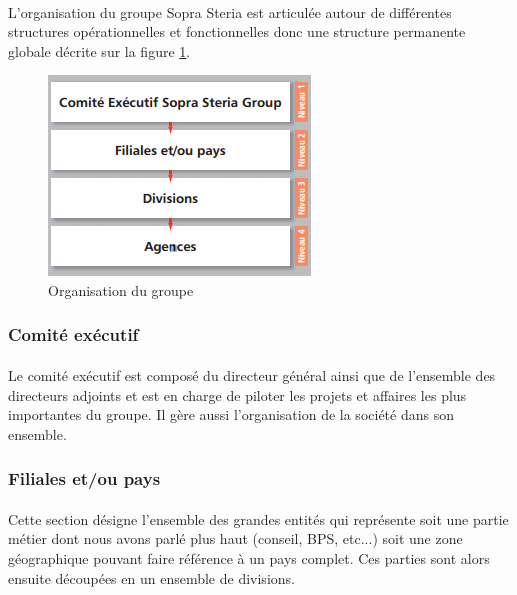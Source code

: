 \paragraph{}
L'organisation du groupe Sopra Steria est articulée autour de différentes structures opérationnelles et fonctionnelles donc une structure permanente globale décrite sur la figure \ref{sopraSteriaOrganisation}.

\begin{figure}[h]
	\includegraphics[scale=0.8]{images/entreprise/sopraSteriaOrganisation.png}
	\centering
	\caption{Organisation du groupe}
	\label{sopraSteriaOrganisation}
\end{figure}
		
\subsubsection{Comité exécutif}
\paragraph{}
Le comité exécutif est composé du directeur général ainsi que de l'ensemble des directeurs adjoints et est en charge de piloter les projets et affaires les plus importantes du groupe. Il gère aussi l'organisation de la société dans son ensemble.

\subsubsection{Filiales et/ou pays}
\paragraph{}
Cette section désigne l'ensemble des grandes entités qui représente soit une partie métier dont nous avons parlé plus haut (conseil, BPS, etc...) soit une zone géographique pouvant faire référence à un pays complet. Ces parties sont alors ensuite découpées en un ensemble de divisions.

